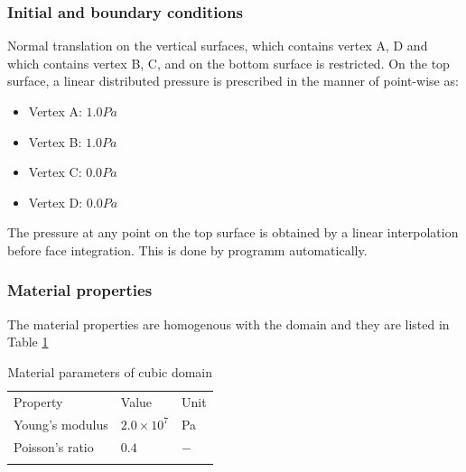 \subsubsection*{Initial and boundary conditions}
 Normal translation on the vertical surfaces, which contains vertex A, D and
which contains vertex B, C, and on the bottom surface is restricted. On the top surface, a linear distributed
 pressure is prescribed in the manner of point-wise as:
 \begin{itemize}
   \item Vertex A: $1.0Pa$
   \item Vertex B:  $1.0Pa$
   \item Vertex C:  $0.0Pa$
   \item Vertex D:  $0.0Pa$
 \end{itemize}
The pressure at any point on the top surface is obtained by a linear interpolation before face integration.
This is done by programm automatically.
\subsubsection*{Material properties}
The material properties are homogenous with the domain and they are listed in Table \ref{tab:ecub}
 \begin{table}[!htb]
\centering
\begin{tabular}{lll}
\hline\hline\noalign{\smallskip}
Property & Value & Unit \\
\noalign{\smallskip}\hline\noalign{\smallskip}
Young's modulus & $2.0\times 10^{7}$  &Pa \\
Poisson's ratio & $0.4$             & $-$ \\
\noalign{\smallskip}\hline\hline
\end{tabular}
\caption{Material parameters of cubic domain}
\label{tab:ecub}
\end{table}
